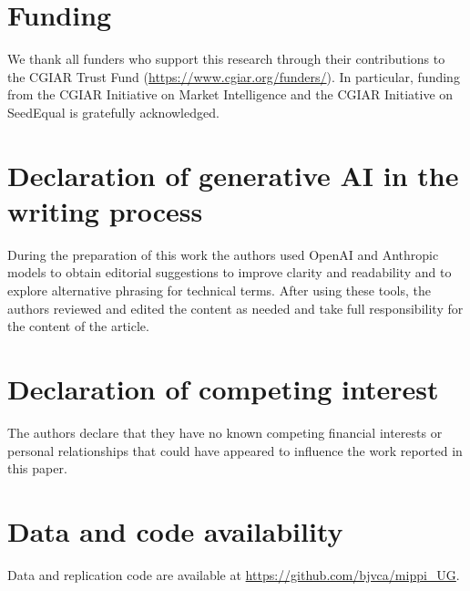 \documentclass[12pt]{article}
\begin{document}
\section*{Funding}

We thank all funders who support this research through their contributions to the
CGIAR Trust Fund (\url{https://www.cgiar.org/funders/}). In particular, funding
from the CGIAR Initiative on Market Intelligence and the CGIAR Initiative on
SeedEqual is gratefully acknowledged.

\section*{Declaration of generative AI in the writing process}

During the preparation of this work the authors used OpenAI and Anthropic models
to obtain editorial suggestions to improve clarity and readability and to explore
alternative phrasing for technical terms. After using these tools, the authors
reviewed and edited the content as needed and take full responsibility for the
content of the article.

\section*{Declaration of competing interest}

The authors declare that they have no known competing financial interests or
personal relationships that could have appeared to influence the work reported in
this paper.

\section*{Data and code availability}

Data and replication code are available at
\url{https://github.com/bjvca/mippi_UG}.
\end{document}

